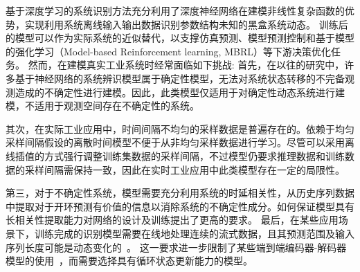 基于深度学习的系统识别方法充分利用了深度神经网络在建模非线性复杂函数的优势，实现利用系统离线输入输出数据识别参数结构未知的黑盒系统动态。
训练后的模型可以作为实际系统的近似替代，以支撑仿真预测、模型预测控制和基于模型的强化学习（Model-based Reinforcement learning, MBRL）等下游决策优化任务。
然而，在建模真实工业系统时经常面临如下挑战:
首先，在以往的研究中，许多基于神经网络的系统辨识模型属于确定性模型，无法对系统状态转移的不完备观测造成的不确定性进行建模。因此，此类模型仅适用于对确定性动态系统进行建模，不适用于观测空间存在不确定性的系统。

其次，在实际工业应用中，时间间隔不均匀的采样数据是普遍存在的\cite{kidger2021}。依赖于均匀采样间隔假设的离散时间模型不便于从非均匀采样数据进行学习。尽管可以采用离线插值的方式强行调整训练集数据的采样间隔，不过模型仍要求推理数据和训练数据的采样间隔需保持一致，因此在实时工业应用中此类模型存在一定的局限性。

第三，对于不确定性系统，模型需要充分利用系统的时延相关性，从历史序列数据中提取对于开环预测有价值的信息以消除系统的不确定性成分。如何保证模型具有长相关性提取能力对网络的设计及训练提出了更高的要求。
最后，在某些应用场景下，训练完成的识别模型需要在线地处理连续的流式数据，且其预测范围及输入序列长度可能是动态变化的~\cite{VSDN_Liu2020}。
这一要求进一步限制了某些端到端编码器-解码器模型的使用~\cite{Rubanova2019,Yildiz2019}，而需要选择具有循环状态更新能力的模型。

